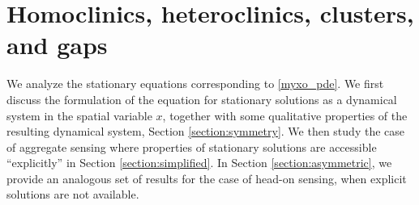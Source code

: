 \documentclass[10pt]{article}
\begin{document}
\section{Homoclinics, heteroclinics, clusters, and gaps}
\label{section:timeindp}
We analyze the stationary equations corresponding to \eqref{myxo_pde}. We first discuss the formulation of the equation for stationary solutions as a dynamical system in the spatial variable $x$, together with some qualitative properties of the resulting dynamical system, Section \ref{section:symmetry}. We then study the case of aggregate sensing  where  properties of stationary solutions are accessible ``explicitly'' in Section \ref{section:simplified}.  
In Section \ref{section:asymmetric}, we provide an analogous set of results for the case of head-on sensing, when explicit solutions are not available. 
\end{document}
